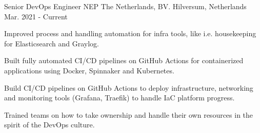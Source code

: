 

\begin{cventries}

  \cventry
  {Senior DevOps Engineer} %
  {NEP The Netherlands, BV.} %
  {Hilversum, Netherlands} %
  {Mar. 2021 - Current} %
  {
    \begin{cvitems} %
      \item {Improved process and handling automation for infra tools, like i.e. housekeeping for Elasticsearch and Graylog.}
      \item {Built fully automated CI/CD pipelines on GitHub Actions for containerized applications using Docker, Spinnaker and Kubernetes.}
      \item {Build CI/CD pipelines on GitHub Actions to deploy infrastructure, networking and monitoring tools (Grafana, Traefik) to handle IaC platform progress.}
      \item {Trained teams on how to take ownership and handle their own resources in the spirit of the DevOps culture.}
    \end{cvitems}
  }


\end{cventries}
